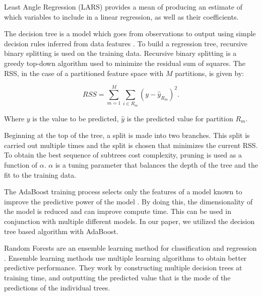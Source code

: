\documentclass[final,3p,times,twocolumn,numbers]{elsarticle}
\begin{document}
Least Angle Regression (LARS) provides a mean of producing an estimate of which variables to include in a linear regression, as well as their coefficients.


%




The decision tree is a model which goes from observations to output using simple decision rules inferred from data features \cite{Quinlan}. To build a regression tree, recursive binary splitting is used on the training data. Recursive binary splitting is a greedy top-down algorithm used to minimize the residual sum of squares. The RSS, in the case of a partitioned feature space with $M$ partitions, is given by:

\begin{equation}
    RSS=\sum^M_{m=1}\sum_{i\in R_m}(y-\hat{y}_{R_m})^2.
\end{equation}

\noindent Where $y$ is the value to be predicted, $\hat{y}$ is the predicted value for partition $R_m$.



Beginning at the top of the tree, a split is made into two branches. This split is carried out multiple times and the split is chosen that minimizes the current RSS. To obtain the best sequence of subtrees cost complexity, pruning is used as a function of $\alpha$. $\alpha$ is a tuning parameter that balances the depth of the tree and the fit to the training data.


The AdaBoost training process selects only the features of a model known to improve the predictive power of the model \cite{Freund1997}. By doing this, the dimensionality of the model is reduced and can improve compute time. This can be used in conjunction with multiple different models. In our paper, we utilized the decision tree based algorithm with AdaBoost.


Random Forests are an ensemble learning method for classification and regression \cite{Breiman2001}. Ensemble learning methods use multiple learning algorithms to obtain better predictive performance. They work by constructing multiple decision trees at training time, and outputting the predicted value that is the mode of the predictions of the individual trees.
\end{document}

